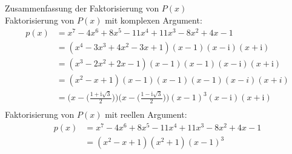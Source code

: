 Zusammenfassung der Faktorisierung von $ P(x) $\\
Faktorisierung von $ P(x) $ mit komplexen Argument:\\
\begin{align*}
p(x)&=x^7-4x^6+8x^5-11x^4+11x^3-8x^2+4x-1\\
&=(x^4-3x^3+4x^2-3x+1)(x-1)(x-\mathrm{i})(x+\mathrm{i})\\
&=(x^3-2x^2+2x-1)(x-1)(x-1)(x-\mathrm{i})(x+\mathrm{i})\\
&=(x^2-x+1)(x-1)(x-1)(x-1)(x-i)(x+i)\\
&=\bigg(x-\bigg(\frac{1+\mathrm{i}\sqrt{3}}{2}\bigg)\bigg)\bigg(x-\bigg(\frac{1-\mathrm{i}\sqrt{3}}{2}\bigg)\bigg)(x-1)^3(x-\mathrm{i})(x+\mathrm{i})\\
\end{align*}
Faktorisierung von $ P(x) $ mit reellen Argument:\\
\begin{align*}
p(x)&=x^7-4x^6+8x^5-11x^4+11x^3-8x^2+4x-1\\
&=(x^2-x+1)(x^2+1)(x-1)^3\\
\end{align*}
